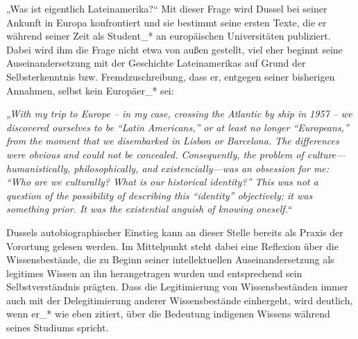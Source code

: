 „Was ist eigentlich Lateinamerika?“ Mit dieser Frage wird Dussel bei seiner
Ankunft in Europa konfrontiert und sie bestimmt seine ersten Texte, die er
während seiner Zeit als Student\_* an europäischen Universitäten publiziert.
Dabei wird ihm die Frage nicht etwa von außen gestellt, viel eher beginnt seine
Auseinandersetzung mit der Geschichte Lateinamerikas auf Grund der
Selbsterkenntnis bzw. Fremdzuschreibung, dass er, entgegen seiner bisherigen
Annahmen, selbst kein Europäer\_* sei:

\begin{myenv}
    \textit{ „With my trip to Europe – in my case, crossing the Atlantic by ship
    in 1957 – we discovered ourselves to be “Latin Americans,” or at least no
    longer “Europeans,” from the moment that we disembarked in Lisbon or
    Barcelona. The differences were obvious and could not be concealed.
    Consequently, the problem of culture—humanistically, philosophically, and
    existencially—was an obsession for me: “Who are we culturally? What is our
    historical identity?” This was not a question of the possibility of
    describing this “identity” objectively; it was something prior. It was the
    existential anguish of knowing oneself.“\footnotemark {}}
\end{myenv}

Dussels autobiographischer Einstieg kann an dieser Stelle bereits als Praxis der
Vorortung gelesen werden. Im Mittelpunkt steht dabei eine Reflexion über die
Wissensbestände, die zu Beginn seiner intellektuellen Auseinandersetzung als
legitimes Wissen an ihn herangetragen wurden und entsprechend sein
Selbstverständnis prägten. Dass die Legitimierung von Wissensbeständen immer
auch mit der Delegitimierung anderer Wissensbestände einhergeht, wird deutlich,
wenn er\_* wie eben zitiert, über die Bedeutung indigenen Wissens während seines
Studiums spricht.

